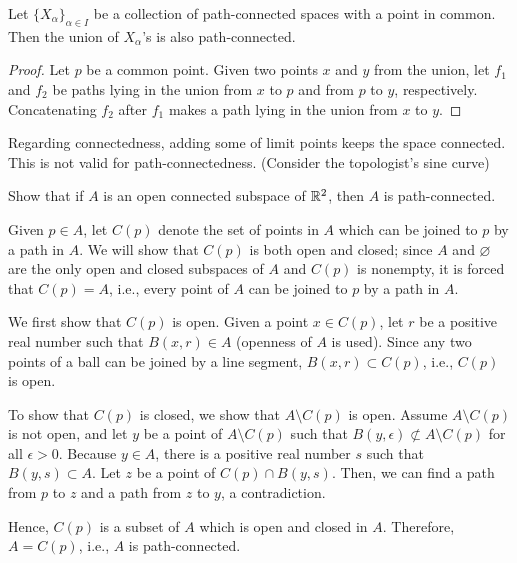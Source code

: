 \begin{prop}
    Let $\{X_\alpha\}_{\alpha\in I}$ be a collection of path-connected spaces with a point in common.
    Then the union of $X_\alpha$'s is also path-connected.
\end{prop}
\begin{proof}
    Let $p$ be a common point.
    Given two points $x$ and $y$ from the union, let $f_1$ and $f_2$ be paths lying in the union from $x$ to $p$ and from $p$ to $y$, respectively.
    Concatenating $f_2$ after $f_1$ makes a path lying in the union from $x$ to $y$.
\end{proof}

\begin{rmk}
    Regarding connectedness, adding some of limit points keeps the space connected.
    This is not valid for path-connectedness. (Consider the topologist's sine curve)
\end{rmk}

\begin{prob}
    Show that if $A$ is an open connected subspace of ${\mathbb{R}}^2$, then $A$ is path-connected.
\end{prob}
\begin{sol}
    Given $p\in A$, let $C(p)$ denote the set of points in $A$ which can be joined to $p$ by a path in $A$.
    We will show that $C(p)$ is both open and closed; since $A$ and $\varnothing$ are the only open and closed subspaces of $A$ and $C(p)$ is nonempty, it is forced that $C(p)=A$, i.e., every point of $A$ can be joined to $p$ by a path in $A$.

    We first show that $C(p)$ is open.
    Given a point $x\in C(p)$, let $r$ be a positive real number such that $B(x, r)\in A$ (openness of $A$ is used).
    Since any two points of a ball can be joined by a line segment, $B(x, r)\subset C(p)$, i.e., $C(p)$ is open.

    To show that $C(p)$ is closed, we show that $A\setminus C(p)$ is open.
    Assume $A\setminus C(p)$ is not open, and let $y$ be a point of $A\setminus C(p)$ such that $B(y, \epsilon)\not\subset A\setminus C(p)$ for all $\epsilon>0$.
    Because $y\in A$, there is a positive real number $s$ such that $B(y, s)\subset A$.
    Let $z$ be a point of $C(p)\cap B(y, s)$.
    Then, we can find a path from $p$ to $z$ and a path from $z$ to $y$, a contradiction.

    Hence, $C(p)$ is a subset of $A$ which is open and closed in $A$.
    Therefore, $A=C(p)$, i.e., $A$ is path-connected.
\end{sol}

